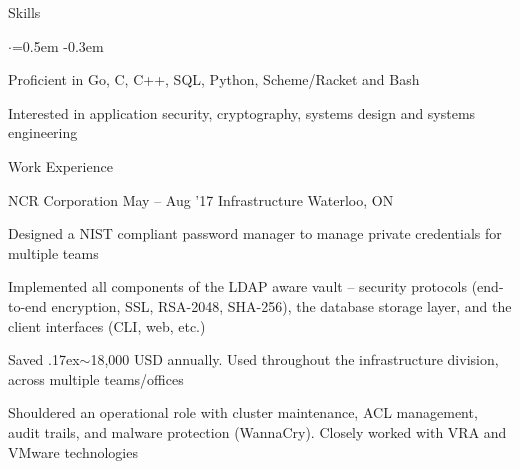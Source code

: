 \documentclass{resume} %
\begin{document}

\begin{rSection}{Skills}
  \vspace {0.3em}
  \begin{list}{$\cdot$}{\leftmargin=0.5em}
    \itemsep -0.3em \vspace{-0.3em}
    \item Proficient in Go, C, C++, SQL, Python, Scheme/Racket and Bash
    \item Interested in application security, cryptography, systems design and
      systems engineering
  \end{list}
  \vspace{0.3em}
\end{rSection}



\begin{rSection}{Work Experience}
  \begin{rSubsection}{NCR Corporation}
		     {May -- Aug '17}
		     {Infrastructure}
		     {Waterloo, ON}
    \item Designed a NIST compliant password manager to manage private
      credentials for multiple teams
    \item Implemented all components of the LDAP aware vault -- security
      protocols (end-to-end encryption, SSL, RSA-2048, SHA-256), the database
      storage layer, and the client interfaces (CLI, web, etc.)
    \item Saved {\raise.17ex\hbox{$\scriptstyle\mathtt{\sim}$}}18,000 USD
      annually. Used throughout the infrastructure division, across multiple
      teams/offices
    \item Shouldered an operational role with cluster maintenance, ACL management,
      audit trails, and malware protection (WannaCry). Closely worked with VRA
      and VMware technologies
  \end{rSubsection}
\end{rSection} 
\end{document}
